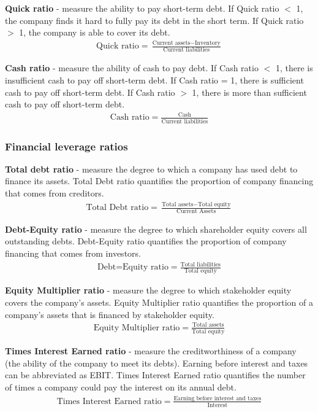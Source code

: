 \textbf{Quick ratio} - measure the ability to pay short-term debt. If Quick ratio $<$ 1, the company finds it hard to fully pay its debt in the short term. If Quick ratio $>$ 1, the company is able to cover its debt.
\begin{gather}
    \textrm{Quick ratio} = \frac{\textrm{Current assets}-\textrm{Inventory}}{\textrm{Current liabilities}}
\end{gather}

\textbf{Cash ratio} - measure the ability of cash to pay debt. If Cash ratio $<$ 1, there is insufficient cash to pay off short-term debt. If Cash ratio = 1, there is sufficient cash to pay off short-term debt. If Cash ratio $>$ 1, there is more than sufficient cash to pay off short-term debt.
\begin{gather}
    \textrm{Cash ratio} = \frac{\textrm{Cash}}{\textrm{Current liabilities}}
\end{gather}
\subsubsection{Financial leverage ratios}
\textbf{Total debt ratio} - measure the degree to which a company has used debt to finance its assets. Total Debt ratio quantifies the proportion of company financing that comes from creditors.
\begin{gather}
    \textrm{Total Debt ratio} = \frac{\textrm{Total assets} - \textrm{Total equity}}{\textrm{Current Assets}}
\end{gather}

\textbf{Debt-Equity ratio} - measure the degree to which shareholder equity covers all outstanding debts. Debt-Equity ratio quantifies the proportion of company financing that comes from investors.
\begin{gather}
    \textrm{Debt=Equity ratio} = \frac{\textrm{Total liabilities}}{\textrm{Total equity}}
\end{gather}

\textbf{Equity Multiplier ratio} - measure the degree to which stakeholder equity covers the company's assets. Equity Multiplier ratio quantifies the proportion of a company's assets that is financed by stakeholder equity.
\begin{gather}
    \textrm{Equity Multiplier ratio} = \frac{\textrm{Total assets}}{\textrm{Total equity}}
\end{gather}

\textbf{Times Interest Earned ratio} - measure the creditworthiness of a company (the ability of the company to meet its debts). Earning before interest and taxes can be abbreviated as EBIT. Times Interest Earned ratio quantifies the number of times a company could pay the interest on its annual debt.
\begin{gather}
    \textrm{Times Interest Earned ratio} = \frac{\textrm{Earning before interest and taxes}}{\textrm{Interest}}
\end{gather}

